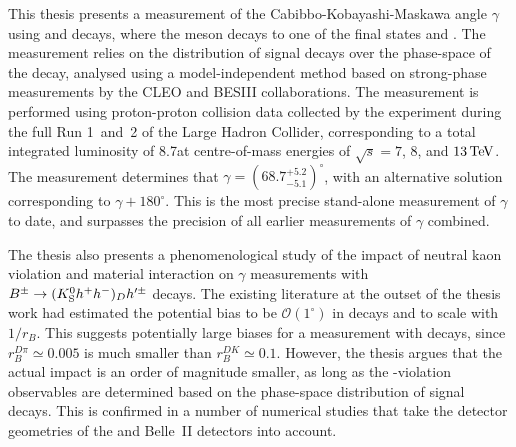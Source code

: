 This thesis presents a measurement of the Cabibbo-Kobayashi-Maskawa angle $\gamma$ using \BtoDK and \BtoDpi decays, where the \D meson decays to one of the final states \Kspipi and \KsKK.  The measurement relies on the distribution of signal decays over the phase-space of the \D decay, analysed using a model-independent method based on strong-phase measurements by the CLEO and BESIII collaborations. The measurement is performed using proton-proton collision data collected by the \lhcb experiment during the full Run 1~and~2 of the Large Hadron Collider, corresponding to a total integrated luminosity of 8.7\invfb at centre-of-mass energies of $\sqrt s =7$, $8$, and $13\text{\,Te\kern -0.1em V}$. The measurement determines that $\gamma= (68.7^{+5.2}_{-5.1})^\circ$, with an alternative solution corresponding to $\gamma+180^\circ$. This is the most precise stand-alone measurement of $\gamma$ to date, and surpasses the precision of all earlier measurements of $\gamma$ combined. 

The thesis also presents a phenomenological study of the impact of neutral kaon \CP violation and material interaction on $\gamma$ measurements with ${{B}^\pm}\rightarrow ({{K}^0_{\mathrm{S}}} h^+h^-)_D h'^\pm$ decays. The existing literature at the outset of the thesis work had estimated the potential bias to be $\mathcal O(1^\circ)$ in \BtoDK decays and to scale with $1/r_B$. This suggests potentially large biases for a measurement with \BtoDpi decays, since $r_B^{D\pi}\simeq0.005$ is much smaller than $r_B^{DK}\simeq 0.1$. However, the thesis argues that the actual impact is an order of magnitude smaller, as long as the \CP-violation observables are determined based on the phase-space distribution of signal decays. This is confirmed in a number of numerical studies that take the detector geometries of the \lhcb and Belle~II detectors into account.